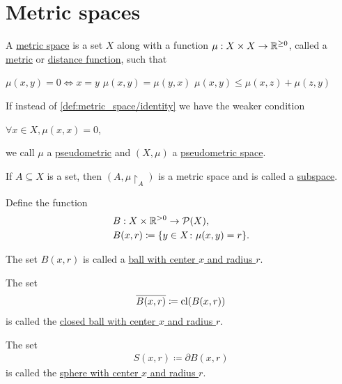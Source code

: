 \section{Metric spaces}\label{sec:metric_spaces}

\begin{definition}\label{def:metric_space}\cite[248]{Engelking1989}
  A \ul{metric space} is a set $X$ along with a function $\mu: X \times X \to \mathbb R^{\geq 0}$, called a \ul{metric} or \ul{distance function}, such that
  \begin{description}
     $\mu(x, y) = 0 \iff x = y$
     $\mu(x, y) = \mu(y, x)$
     $\mu(x, y) \leq \mu(x, z) + \mu(z, y)$
  \end{description}

  If instead of \ref{def:metric_space/identity} we have the weaker condition
  \begin{description}
     $\forall x \in X, \mu(x, x) = 0$,
  \end{description}
  we call $\mu$ a \ul{pseudometric} and $(X, \mu)$ a \ul{pseudometric space}.

  \begin{defenum}
    \item\label{def:metric_space/subspace} If $A \subseteq X$ is a set, then $(A, \mu{\restriction_A})$ is a metric space and is called a \ul{subspace}.

    \item\label{def:metric_space/ball} Define the function
    \begin{align*}
      &B: X \times \mathbb R^{>0} \to \operatorname{\mathcal P}(X), \\
      &B(x, r) \coloneqq \{ y \in X \colon \mu(x, y) = r \}.
    \end{align*}

    The set $B(x, r)$ is called a \ul{ball with center $x$ and radius $r$}.

    \item\label{def:metric_space/closed_ball} The set
    \begin{align*}
      \overline{B(x, r)} \coloneqq \operatorname{cl}(B(x, r))
    \end{align*}
    is called the \ul{closed ball with center $x$ and radius $r$}.

    \item\label{def:metric_space/closed_ball} The set
    \begin{align*}
      S(x, r) \coloneqq \partial{B(x, r)}
    \end{align*}
    is called the \ul{sphere with center $x$ and radius $r$}.


\end{defenum}
\end{definition}
